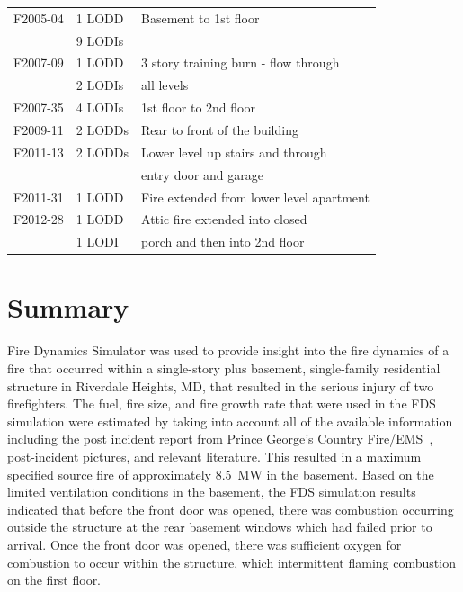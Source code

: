 \documentclass[12pt,oneside]{book}
\begin{document}
\begin{table}[!ht]
\begin{tabular}{lll}
F2005-04 \cite{NIOSH:McFall4}       &  1 LODD             &  Basement to 1st floor                     \\
                                    &  9 LODIs            &                                            \\
F2007-09 \cite{NIOSH:Tarley}        &  1 LODD             &  3 story training burn - flow through      \\
                                    &  2 LODIs            &  all levels                                \\
F2007-35 \cite{NIOSH:Braddee}       &  4 LODIs            &  1st floor to 2nd floor                    \\
F2009-11 \cite{NIOSH:Merinar}       &  2 LODDs            &  Rear to front of the building             \\
F2011-13 \cite{NIOSH:Bowyer2}       &  2 LODDs            &  Lower level up stairs and through         \\
                                    &                     &  entry door and garage                     \\
F2011-31 \cite{NIOSH:Loflin}        &  1 LODD             &  Fire extended from lower level apartment  \\
F2012-28 \cite{NIOSH:Bowyer}        &  1 LODD             &  Attic fire extended into closed           \\
                                    &  1 LODI             &  porch and then into 2nd floor             \\
\bottomrule
\end{tabular}
\label{tab:LODD}
\end{table}

\clearpage

\chapter{Summary}
Fire Dynamics Simulator was used to provide insight into the fire dynamics of a fire that occurred within a single-story plus basement, single-family residential structure in Riverdale Heights, MD, that resulted in the serious injury of two firefighters. The fuel, fire size, and fire growth rate that were used in the FDS simulation were estimated by taking into account all of the available information including the post incident report from Prince George's Country Fire/EMS~\cite{PGCounty2013}, post-incident pictures, and relevant literature. This resulted in a maximum specified source fire of approximately 8.5~MW in the basement. Based on the limited ventilation conditions in the basement, the FDS simulation results indicated that before the front door was opened, there was combustion occurring outside the structure at the rear basement windows which had failed prior to arrival. Once the front door was opened, there was sufficient oxygen for combustion to occur within the structure, which intermittent flaming combustion on the first floor.
\end{document}
